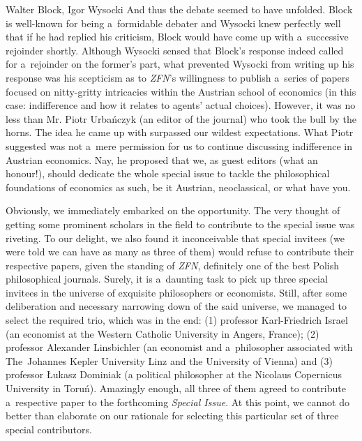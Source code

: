 \begin{editorialeng}{Walter Block, Igor Wysocki}
And thus the debate seemed to have unfolded. Block is well-known for being a~formidable debater and Wysocki knew perfectly well that if he had replied his criticism, Block would have come up with a~successive rejoinder shortly. Although Wysocki sensed that Block's response indeed called for a~rejoinder on the former's part, what prevented Wysocki from writing up his response was his scepticism as to \textit{ZFN}'s willingness to publish a~series of papers focused on nitty-gritty intricacies within the Austrian school of economics (in this case: indifference and how it relates to agents' actual choices). However, it was no less than Mr. Piotr Urbańczyk (an editor of the journal) who took the bull by the horns. The idea he came up with surpassed our wildest expectations. What Piotr suggested was not a~mere permission for us to continue discussing indifference in Austrian economics. Nay, he proposed that we, as guest editors (what an honour!), should dedicate the whole special issue to tackle the philosophical foundations of economics as such, be it Austrian, neoclassical, or what have you.



Obviously, we immediately embarked on the opportunity. The very thought of getting some prominent scholars in the field to contribute to the special issue was riveting. To our delight, we also found it inconceivable that special invitees (we were told we can have as many as three of them) would refuse to contribute their respective papers, given the standing of \textit{ZFN}, definitely one of the best Polish philosophical journals. Surely, it is a~daunting task to pick up three special invitees in the universe of exquisite philosophers or economists. Still, after some deliberation and necessary narrowing down of the said universe, we managed to select the required trio, which was in the end: (1) professor Karl-Friedrich Israel (an economist at the Western Catholic University in Angers, France); (2) professor Alexander Linsbichler (an economist and a~philosopher associated with The~Johannes Kepler University Linz and the University of Vienna) and (3) professor Łukasz Dominiak (a political philosopher at the Nicolaus Copernicus University in Toruń). Amazingly enough, all three of them agreed to contribute a~respective paper to the forthcoming \textit{Special Issue}. At this point, we cannot do better than elaborate on our rationale for selecting this particular set of three special contributors.




\end{editorialeng}
